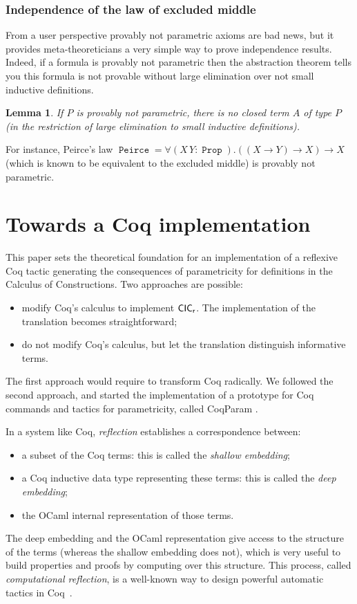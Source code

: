 \documentclass[a4paper,USenglish]{lipics}
\newtheorem{lem}{Lemma}
\DeclareMathOperator{\Prop}{\mathtt{Prop}}
\DeclareMathOperator{\NNPP}{\mathtt{Peirce}}
\def\coq{\textsf{Coq}\xspace}
\def\cicr{$\text{\textsf{CIC}}_{\text{\textsf{r}}}$\xspace}
\def\ocaml{\textsf{OCaml}\xspace}
\def\coqparam{\textsf{CoqParam}\xspace}
\begin{document}
\subsubsection{Independence of the law of excluded middle}\label{sec:examples:axioms:independence}

From a user perspective provably not parametric axioms are bad news, but
it provides meta-theoreticians a very simple way to prove independence results.
Indeed, if a formula is provably not parametric then the abstraction theorem
tells you this formula is not provable without large elimination over
not small inductive definitions.

\begin{lem}
  If $P$ is provably not parametric, there is no closed term
  $A$ of type $P$ (in the restriction of large elimination to small
  inductive definitions).
\end{lem}

For instance, Peirce's law  $ \NNPP =  ∀ (X\,Y:\Prop). ((X → Y ) → X)  → X$
(which is known to be equivalent to the
 excluded middle) is provably not parametric.


\section{Towards a \coq implementation}\label{sec:tactic}

This paper sets the theoretical foundation for an implementation of a
reflexive \coq tactic generating the consequences of parametricity for
definitions in the Calculus of Constructions. Two approaches are
possible:
\begin{itemize}
\item modify \coq's calculus to implement \cicr. The implementation of
  the translation becomes straightforward;
\item do not modify \coq's calculus, but let the translation distinguish
  informative terms.
\end{itemize}
The first approach would require to transform \coq radically. We followed
the second approach, and started the implementation of a prototype for
\coq commands and tactics for parametricity, called \coqparam
\cite{implem12}.

In a system like \coq, \emph{reflection} establishes a correspondence
between:
\begin{itemize}
\item a subset of the \coq terms: this is called the \emph{shallow
    embedding};
\item a \coq inductive data type representing these terms: this is
  called the \emph{deep embedding};
\item the \ocaml internal representation of those terms.
\end{itemize}
The deep embedding and the \ocaml representation give access to the
structure of the terms (whereas the shallow embedding does not), which
is very useful to build properties and proofs by computing over this
structure. This process, called \emph{computational reflection}, is a
well-known way to design powerful automatic tactics in
\coq~\cite{DBLP:conf/tphol/GregoireM05,GregoireTW06,DBLP:conf/cpp/ArmandFGKTW11}.
\end{document}
